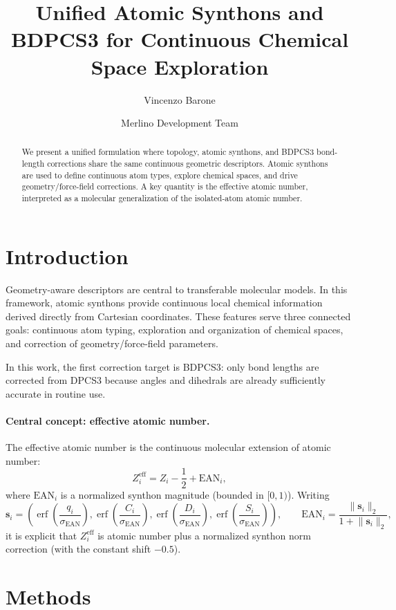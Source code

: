 \documentclass[journal=jctcce,manuscript=article]{achemso}
\title{Unified Atomic Synthons and BDPCS3 for Continuous Chemical Space Exploration}
\author{Vincenzo Barone}
\affiliation{Department of Chemistry, University of Bologna, Bologna, Italy}
\author{Merlino Development Team}
\affiliation{Merlino Project}
\begin{document}
\begin{abstract}
We present a unified formulation where topology, atomic synthons, and BDPCS3 bond-length corrections share the same continuous geometric descriptors. Atomic synthons are used to define continuous atom types, explore chemical spaces, and drive geometry/force-field corrections. A key quantity is the effective atomic number, interpreted as a molecular generalization of the isolated-atom atomic number.
\end{abstract}

\section{Introduction}
Geometry-aware descriptors are central to transferable molecular models. In this framework, atomic synthons provide continuous local chemical information derived directly from Cartesian coordinates. These features serve three connected goals: continuous atom typing, exploration and organization of chemical spaces, and correction of geometry/force-field parameters.

In this work, the first correction target is BDPCS3: only bond lengths are corrected from DPCS3 because angles and dihedrals are already sufficiently accurate in routine use.

\paragraph{Central concept: effective atomic number.}
The effective atomic number is the continuous molecular extension of atomic number:
\begin{equation}
Z^{\mathrm{eff}}_i = Z_i-\frac{1}{2}+\mathrm{EAN}_i,
\end{equation}
where $\mathrm{EAN}_i$ is a normalized synthon magnitude (bounded in $[0,1)$). Writing
\begin{equation}
\mathbf{s}_i=
\left(
\operatorname{erf}\!\left(\frac{q_i}{\sigma_{\mathrm{EAN}}}\right),
\operatorname{erf}\!\left(\frac{C_i}{\sigma_{\mathrm{EAN}}}\right),
\operatorname{erf}\!\left(\frac{D_i}{\sigma_{\mathrm{EAN}}}\right),
\operatorname{erf}\!\left(\frac{S_i}{\sigma_{\mathrm{EAN}}}\right)
\right),
\qquad
\mathrm{EAN}_i=\frac{\lVert\mathbf{s}_i\rVert_2}{1+\lVert\mathbf{s}_i\rVert_2},
\end{equation}
it is explicit that $Z_i^{\mathrm{eff}}$ is atomic number plus a normalized synthon norm correction (with the constant shift $-0.5$).

\section{Methods}
\end{document}
